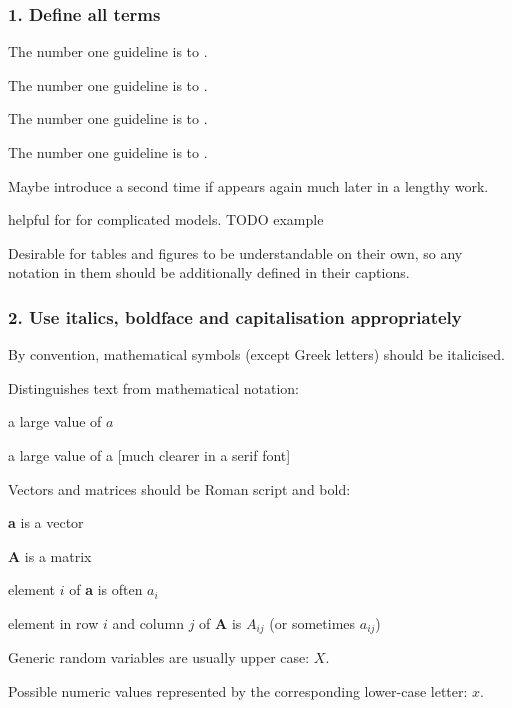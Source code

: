 \begin{frame}
\frametitle{1. Define all terms}

The number one guideline is to .

\pause

The number one guideline is to .

\pause

The number one guideline is to .

\pause

The number one guideline is to .

\pause

\medskip

Maybe introduce a second time if appears again much later in a lengthy work.

\medskip

 helpful for for complicated models. TODO example

\medskip

\pause

Desirable for tables and figures to be understandable on their own, so any
notation in them should be
additionally defined in their captions.


\end{frame}



\begin{frame}
\frametitle{2. Use italics, boldface and capitalisation appropriately}

By convention, mathematical symbols (except Greek letters) should be italicised.

Distinguishes text from mathematical notation:

\bi
\item a large value of $a$
\item a large value of a [much clearer in a serif font]
\ei

Vectors and matrices should be Roman script and bold:
\bi
\item {\bf a} is a vector
\item {\bf A} is a matrix
\item element $i$ of {\bf a} is often $a_i$
\item element in row $i$ and column $j$ of {\bf A} is  $A_{ij}$ (or sometimes
  $a_{ij}$)
\ei


Generic random variables are usually upper case:  $X$.

Possible numeric values represented by the corresponding lower-case letter: $x$.
\end{frame}

